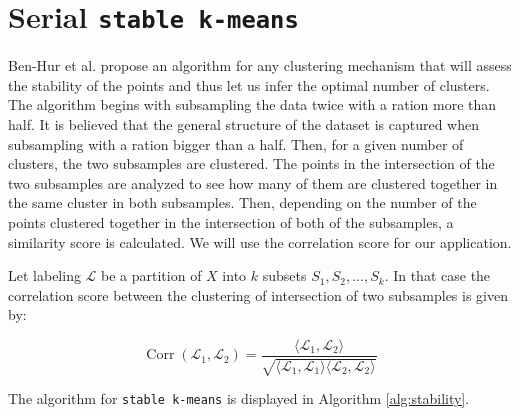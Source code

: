 \documentclass[10pt,twocolumn,letterpaper]{article}
\DeclareMathOperator{\Corr}{Corr}
\begin{document}
\section{Serial \texttt{stable k-means}} \label{section:stable}


Ben-Hur et al. \cite{ben2001} propose an algorithm for any clustering mechanism that will assess the stability of the points and thus let us infer the optimal number of clusters. The algorithm begins with subsampling the data twice with a ration more than half. It is believed that the general structure of the dataset is captured when subsampling with a ration bigger than a half. Then, for a given number of clusters, the two subsamples are clustered. The points in the intersection of the two subsamples are analyzed to see how many of them are clustered together in the same cluster in both subsamples. Then, depending on the number of the points clustered together in the intersection of both of the subsamples, a similarity score is calculated. We will use the correlation score for our application.

Let labeling $\mathcal{L}$ be a partition of $X$ into $k$ subsets $S_1, S_2, ... , S_k$. In that case the correlation score between the clustering of intersection of two subsamples is given by: 

\[
\Corr(\mathcal{L}_1, \mathcal{L}_2) = \frac{\langle \mathcal{L}_1, \mathcal{L}_2 \rangle}{\sqrt{\langle \mathcal{L}_1,\mathcal{L}_1\rangle \langle \mathcal{L}_2,\mathcal{L}_2\rangle}}
\]

The algorithm for \texttt{stable k-means} is displayed in Algorithm \ref{alg:stability}.
\end{document}
